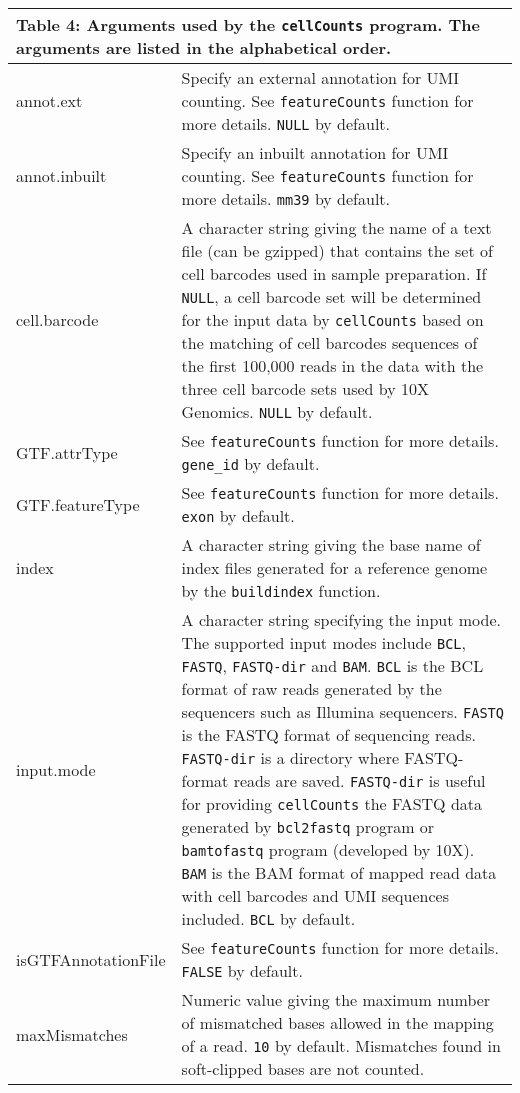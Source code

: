 \documentclass[12pt]{report}
\newcommand{\code}[1]{{\small\texttt{#1}}}
\begin{document}
\begin{longtable}{|p{4.5cm}|p{11cm}|}
\multicolumn{2}{p{16cm}}{Table 4: Arguments used by the \code{cellCounts} program.
The arguments are listed in the alphabetical order.}
\endfirsthead
\hline
Arguments & Description \\
\hline
annot.ext & Specify an external annotation for UMI counting. See \code{featureCounts} function for more details. \code{NULL} by default.\\
\hline
annot.inbuilt & Specify an inbuilt annotation for UMI counting. See \code{featureCounts} function for more details. \code{mm39} by default.\\
\hline
cell.barcode & A character string giving the name of a text file (can be gzipped) that contains the set of cell barcodes used in sample preparation. If \code{NULL}, a cell barcode set will be determined for the input data by \code{cellCounts} based on the matching of cell barcodes sequences of the first 100,000 reads in the data with the three cell barcode sets used by 10X Genomics. \code{NULL} by default.\\
\hline
GTF.attrType & See \code{featureCounts} function for more details. \code{gene\_id} by default. \\
\hline
GTF.featureType & See \code{featureCounts} function for more details. \code{exon} by default. \\
\hline
index & A character string giving the base name of index files generated for a reference genome by the \code{buildindex} function. \\
\hline
input.mode & A character string specifying the input mode. The supported input modes include \code{BCL}, \code{FASTQ}, \code{FASTQ-dir} and \code{BAM}. \code{BCL} is the BCL format of raw reads generated by the sequencers such as Illumina sequencers. \code{FASTQ} is the FASTQ format of sequencing reads. \code{FASTQ-dir} is a directory where FASTQ-format reads are saved. \code{FASTQ-dir} is useful for providing \code{cellCounts} the FASTQ data generated by \code{bcl2fastq} program or \code{bamtofastq} program (developed by 10X). \code{BAM} is the BAM format of mapped read data with cell barcodes and UMI sequences included. \code{BCL} by default.\\
\hline
isGTFAnnotationFile & See \code{featureCounts} function for more details. \code{FALSE} by default. \\
\hline
maxMismatches & Numeric value giving the maximum number of mismatched bases allowed in the mapping of a read. \code{10} by default. Mismatches found in soft-clipped bases are not counted.\\

\end{longtable}
\end{document}
